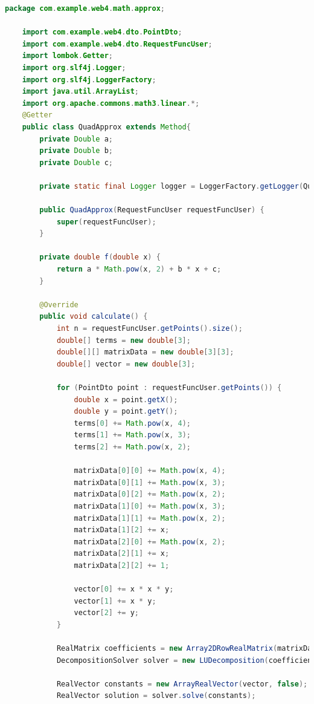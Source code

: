 \documentclass{article}
\begin{document}
\begin{lstlisting}[language=Java, caption={Квадратичная аппроксимация}]
    package com.example.web4.math.approx;

    import com.example.web4.dto.PointDto;
    import com.example.web4.dto.RequestFuncUser;
    import lombok.Getter;
    import org.slf4j.Logger;
    import org.slf4j.LoggerFactory;
    import java.util.ArrayList;
    import org.apache.commons.math3.linear.*;
    @Getter
    public class QuadApprox extends Method{
        private Double a;
        private Double b;
        private Double c;
    
        private static final Logger logger = LoggerFactory.getLogger(QuadApprox.class);
    
        public QuadApprox(RequestFuncUser requestFuncUser) {
            super(requestFuncUser);
        }
    
        private double f(double x) {
            return a * Math.pow(x, 2) + b * x + c;
        }
    
        @Override
        public void calculate() {
            int n = requestFuncUser.getPoints().size();
            double[] terms = new double[3];
            double[][] matrixData = new double[3][3];
            double[] vector = new double[3];
    
            for (PointDto point : requestFuncUser.getPoints()) {
                double x = point.getX();
                double y = point.getY();
                terms[0] += Math.pow(x, 4);
                terms[1] += Math.pow(x, 3);
                terms[2] += Math.pow(x, 2);
    
                matrixData[0][0] += Math.pow(x, 4);
                matrixData[0][1] += Math.pow(x, 3);
                matrixData[0][2] += Math.pow(x, 2);
                matrixData[1][0] += Math.pow(x, 3);
                matrixData[1][1] += Math.pow(x, 2);
                matrixData[1][2] += x;
                matrixData[2][0] += Math.pow(x, 2);
                matrixData[2][1] += x;
                matrixData[2][2] += 1;
    
                vector[0] += x * x * y;
                vector[1] += x * y;
                vector[2] += y;
            }
    
            RealMatrix coefficients = new Array2DRowRealMatrix(matrixData, false);
            DecompositionSolver solver = new LUDecomposition(coefficients).getSolver();
    
            RealVector constants = new ArrayRealVector(vector, false);
            RealVector solution = solver.solve(constants);
    

\end{lstlisting}
\end{document}
